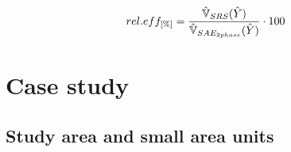 \begin{equation}\label{eq:releff}
rel.eff_{[\%]}=\frac{\hat{\mathbb{V}}_{SRS}(\hat{Y})}{\hat{\mathbb{V}}_{SAE_{2phase}}(\hat{Y})}\cdot100
\end{equation}

\newpage



\section{Case study}
\label{sec:CaseStudy}


\subsection{Study area and small area units}
\label{sec:studyarea}

